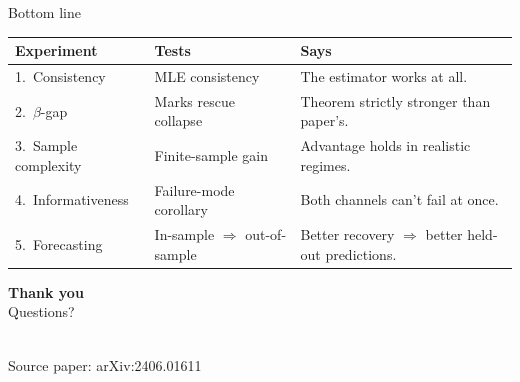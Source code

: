 \documentclass[aspectratio=169,11pt]{beamer}
\begin{document}
\begin{frame}{Bottom line}
  \vspace{0.0cm}
  \begin{center}
    \begin{tabular}{@{}p{2.8cm}p{4.5cm}p{6.0cm}@{}}
      \toprule
      \textbf{Experiment} & \textbf{Tests} & \textbf{Says} \\
      \midrule
      1.\ Consistency        & MLE consistency        & The estimator works at all. \\[0.1cm]
      2.\ $\beta$-gap        & Marks rescue collapse  & Theorem strictly stronger than paper's. \\[0.1cm]
      3.\ Sample complexity  & Finite-sample gain     & Advantage holds in realistic regimes. \\[0.1cm]
      4.\ Informativeness    & Failure-mode corollary & Both channels can't fail at once. \\[0.1cm]
      5.\ Forecasting        & In-sample $\Rightarrow$ out-of-sample & Better recovery $\Rightarrow$ better held-out predictions. \\
      \bottomrule
    \end{tabular}
  \end{center}

  \vspace{0.5cm}

  \begin{center}
  \end{center}
\end{frame}

\begin{frame}[plain]
  \begin{center}
    \vspace{2cm}
    {\Huge\bfseries\textcolor{accent}{Thank you}}\\[1cm]
    {\Large Questions?}\\[2cm]
    \\[0.5cm]
    {\large Source paper: arXiv:2406.01611}
  \end{center}
\end{frame}
\end{document}
